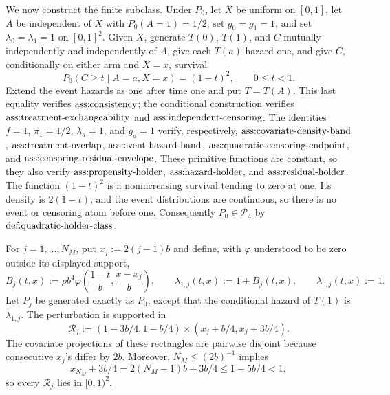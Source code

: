 We now construct the finite subclass.  Under \(P_0\), let \(X\) be uniform on \([0,1]\), let \(A\) be independent of \(X\) with \(P_0(A=1)=1/2\), set \(g_0=g_1=1\), and set \(\lambda_0=\lambda_1=1\) on \([0,1]^2\).  Given \(X\), generate \(T(0)\), \(T(1)\), and \(C\) mutually independently and independently of \(A\), give each \(T(a)\) hazard one, and give \(C\), conditionally on either arm and \(X=x\), survival
\[
 P_0(C\ge t\mid A=a,X=x)=(1-t)^2,
 \qquad 0\le t<1.
\]
Extend the event hazards as one after time one and put \(T=T(A)\).  This last equality verifies \(\textnormal{ass:consistency}\); the conditional construction verifies \(\textnormal{ass:treatment-exchangeability}\) and \(\textnormal{ass:independent-censoring}\).  The identities \(f=1\), \(\pi_1=1/2\), \(\lambda_a=1\), and \(g_a=1\) verify, respectively, \(\textnormal{ass:covariate-density-band}\), \(\textnormal{ass:treatment-overlap}\), \(\textnormal{ass:event-hazard-band}\), \(\textnormal{ass:quadratic-censoring-endpoint}\), and \(\textnormal{ass:censoring-residual-envelope}\).  These primitive functions are constant, so they also verify \(\textnormal{ass:propensity-holder}\), \(\textnormal{ass:hazard-holder}\), and \(\textnormal{ass:residual-holder}\).  The function \((1-t)^2\) is a nonincreasing survival tending to zero at one.  Its density is \(2(1-t)\), and the event distributions are continuous, so there is no event or censoring atom before one.  Consequently \(P_0\in\mathcal P_4\) by \(\textnormal{def:quadratic-holder-class}\).

For \(j=1,\ldots,N_M\), put \(x_j:=2(j-1)b\) and define, with \(\varphi\) understood to be zero outside its displayed support,
\[
 B_j(t,x):=\rho b^4
 \varphi\!\left(\frac{1-t}{b},\frac{x-x_j}{b}\right),
 \qquad
 \lambda_{1,j}(t,x):=1+B_j(t,x),
 \qquad
 \lambda_{0,j}(t,x):=1.                                  \tag{4}
\]
Let \(P_j\) be generated exactly as \(P_0\), except that the conditional hazard of \(T(1)\) is \(\lambda_{1,j}\).  The perturbation is supported in
\[
 \mathcal R_j:=
 (1-3b/4,1-b/4)\times(x_j+b/4,x_j+3b/4).                  \tag{5}
\]
The covariate projections of these rectangles are pairwise disjoint because consecutive \(x_j\)'s differ by \(2b\).  Moreover, \(N_M\le(2b)^{-1}\) implies
\[
 x_{N_M}+3b/4=2(N_M-1)b+3b/4\le1-5b/4<1,
\]
so every \(\mathcal R_j\) lies in \([0,1)^2\).

